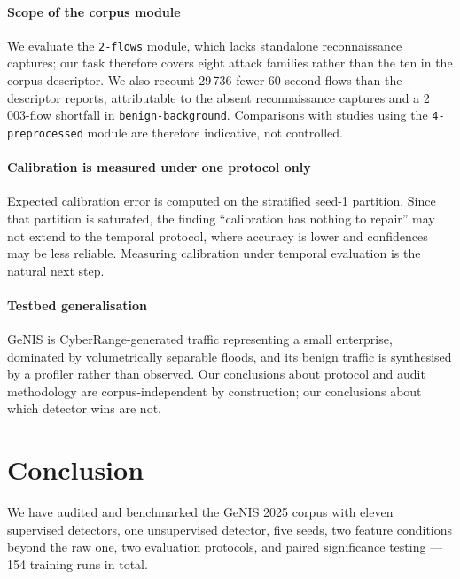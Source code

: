 \documentclass[review,12pt]{elsarticle}
\begin{document}
\paragraph{Scope of the corpus module}
We evaluate the \texttt{2-flows} module, which lacks standalone reconnaissance captures;
our task therefore covers eight attack families rather than the ten in the corpus
descriptor. We also recount 29\,736 fewer 60-second flows than the descriptor reports,
attributable to the absent reconnaissance captures and a 2\,003-flow shortfall in
\texttt{benign-background}. Comparisons with studies using the \texttt{4-preprocessed}
module are therefore indicative, not controlled.

\paragraph{Calibration is measured under one protocol only}
Expected calibration error is computed on the stratified seed-1 partition. Since that
partition is saturated, the finding ``calibration has nothing to repair'' may not extend
to the temporal protocol, where accuracy is lower and confidences may be less reliable.
Measuring calibration under temporal evaluation is the natural next step.

\paragraph{Testbed generalisation}
GeNIS is CyberRange-generated traffic representing a small enterprise, dominated by
volumetrically separable floods, and its benign traffic is synthesised by a profiler
rather than observed. Our conclusions about protocol and audit methodology are
corpus-independent by construction; our conclusions about which detector wins are not.

\section{Conclusion}
\label{sec:conclusion}

We have audited and benchmarked the GeNIS 2025 corpus with eleven supervised detectors,
one unsupervised detector, five seeds, two feature conditions beyond the raw one, two
evaluation protocols, and paired significance testing --- 154 training runs in total.
\end{document}
